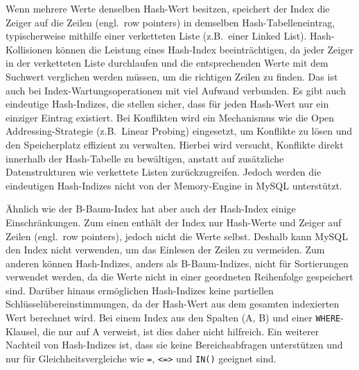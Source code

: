 Wenn mehrere Werte denselben Hash-Wert besitzen, speichert der Index die Zeiger auf die Zeilen (engl.\ row pointers) in demselben Hash-Tabelleneintrag, typischerweise mithilfe einer verketteten Liste (z.B.\ einer Linked List).
Hash-Kollisionen können die Leistung eines Hash-Index beeinträchtigen, da jeder Zeiger in der verketteten Liste durchlaufen und die entsprechenden Werte mit dem Suchwert verglichen werden müssen, um die richtigen Zeilen zu finden.
Das ist auch bei Index-Wartungsoperationen mit viel Aufwand verbunden.
Es gibt auch eindeutige Hash-Indizes, die stellen sicher, dass für jeden Hash-Wert nur ein einziger Eintrag existiert.
Bei Konflikten wird ein Mechanismus wie die Open Addressing-Strategie (z.B.\ Linear Probing) eingesetzt, um Konflikte zu lösen und den Speicherplatz effizient zu verwalten.
Hierbei wird versucht, Konflikte direkt innerhalb der Hash-Tabelle zu bewältigen, anstatt auf zusätzliche Datenstrukturen wie verkettete Listen zurückzugreifen.
Jedoch werden die eindeutigen Hash-Indizes nicht von der Memory-Engine in MySQL unterstützt.

%
%

Ähnlich wie der B-Baum-Index hat aber auch der Hash-Index einige Einschränkungen.
Zum einen enthält der Index nur Hash-Werte und Zeiger auf Zeilen (engl.\ row pointers), jedoch nicht die Werte selbst.
Deshalb kann MySQL den Index nicht verwenden, um das Einlesen der Zeilen zu vermeiden.
Zum anderen können Hash-Indizes, anders als B-Baum-Indizes, nicht für Sortierungen verwendet werden, da die Werte nicht in einer geordneten Reihenfolge gespeichert sind.
Darüber hinaus ermöglichen Hash-Indizes keine partiellen Schlüsselübereinstimmungen, da der Hash-Wert aus dem gesamten indexierten Wert berechnet wird.
Bei einem Index aus den Spalten (A, B) und einer \texttt{WHERE}-Klausel, die nur auf A verweist, ist dies daher nicht hilfreich.
Ein weiterer Nachteil von Hash-Indizes ist, dass sie keine Bereichsabfragen unterstützen und nur für Gleichheitsvergleiche wie \texttt{=}, \texttt{<=>} und \texttt{IN()} geeignet sind.

